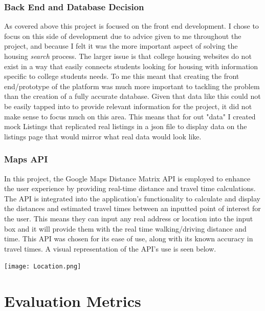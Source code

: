 \documentclass[10pt,twocolumn]{article}
\begin{document}
\subsubsection{Back End and Database Decision}
As covered above this project is focused on the front end development. I chose to focus on this side of development due to advice given to me throughout the project, and because I felt it was the more important aspect of solving the housing \textit{search} process. The larger issue is that college housing websites do not exist in a way that easily connects students looking for housing with information specific to college students needs. To me this meant that creating the front end/prototype of the platform was much more important to tackling the problem than the creation of a fully accurate database. Given that data like this could not be easily tapped into to provide relevant information for the project, it did not make sense to focus much on this area. This means that for out "data" I created mock Listings that replicated real listings in a json file to display data on the listings page that would mirror what real data would look like. 

\subsubsection{Maps API}
In this project, the Google Maps Distance Matrix API is employed to enhance the user experience by providing real-time distance and travel time calculations. The API is integrated into the application's functionality to calculate and display the distances and estimated travel times between an inputted point of interest for the user. This means they can input any real address or location into the input box and it will provide them with the real time walking/driving distance and time. This API was chosen for its ease of use, along with its known accuracy in travel times. A visual representation of the API's use is seen below. \\

\centerline{\texttt{[image: Location.png]}}

\section{Evaluation Metrics}
\end{document}
